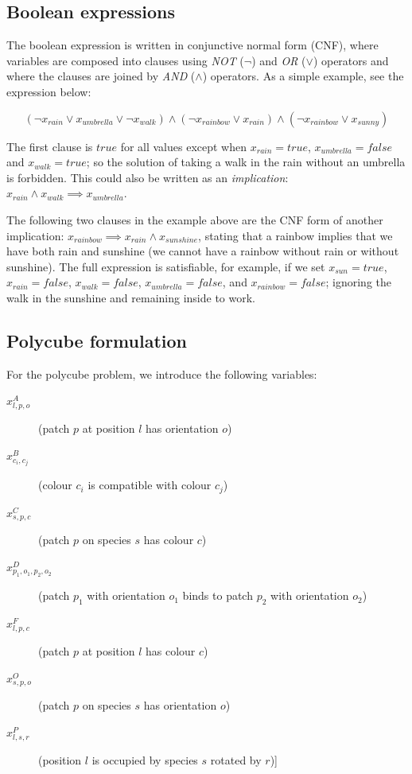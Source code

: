 \subsection{Boolean expressions}

The boolean expression is written in conjunctive normal form (CNF), where variables are composed into clauses using \emph{NOT} (\(\lnot\)) and \emph{OR} (\(\lor\)) operators and where the clauses are joined by \emph{AND} (\(\land\)) operators. As a simple example, see the expression below:

\[
    (\lnot x_{rain} \lor x_{umbrella} \lor  \lnot x_{walk}) \land
    (\lnot x_{rainbow} \lor x_{rain}) \land
    (\lnot x_{rainbow} \lor x_{sunny})
\]

The first clause is \({true}\) for all values except when \(x_{rain}={true}\), \(x_{umbrella}={false}\) and \(x_{walk}=true\); so the solution of taking a walk in the rain without an umbrella is forbidden. This could also be written as an \emph{implication}: \(x_{rain} \land x_{walk} \implies x_{umbrella}\).

The following two clauses in the example above are the CNF form of another implication: \(x_{rainbow} \implies  x_{rain} \land x_{sunshine}\), stating that a rainbow implies that we have both rain and sunshine (we cannot have a rainbow without rain or without sunshine). The full expression is satisfiable, for example, if we set \(x_{sun}=true\), \(x_{rain}=false\), \(x_{walk}=false\), \(x_{umbrella}=false\), and \(x_{rainbow}=false\); ignoring the walk in the sunshine and remaining inside to work.

\subsection{Polycube formulation}

For the polycube problem, we introduce the following variables:
\begin{description}
    \item[\(x_{l,p,o}^{A}\)] (patch \(p\) at position \(l\) has orientation \(o\))
    \item[\(x_{c_i,c_j}^{B}\)] (colour \(c_i\) is compatible with colour \(c_j\))
    \item[\(x_{s,p,c}^{C}\)] (patch \(p\) on species \(s\) has colour \(c\))
    \item[\(x_{p_1,o_1,p_2,o_2}^{D}\)] (patch \(p_1\) with orientation \(o_1\) binds to patch \(p_2\) with orientation \(o_2\))
    \item[\(x_{l,p,c}^{F}\)] (patch \(p\) at position \(l\) has colour \(c\))
    \item[\(x_{s,p,o}^{O}\)] (patch \(p\) on species \(s\) has orientation \(o\))
    \item[\(x_{l,s,r}^{P}\)] (position \(l\) is occupied by species \(s\) rotated by \(r\))] 
\end{description}

